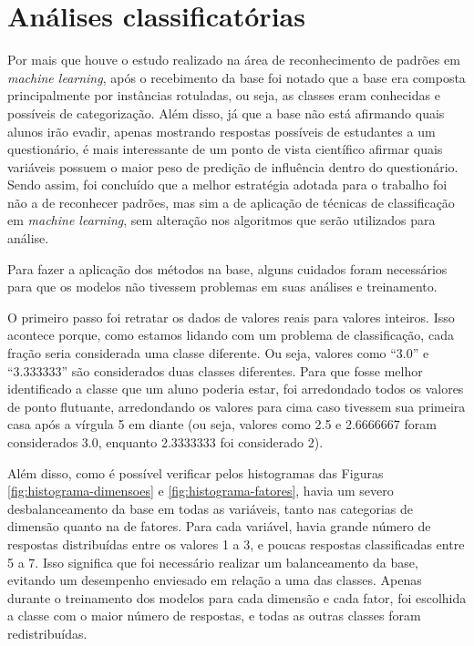 \chapter{Análises classificatórias}

Por mais que houve o estudo realizado na área de reconhecimento de padrões em \textit{machine learning}, após o recebimento da base foi notado que a base era composta principalmente por instâncias rotuladas, ou seja, as classes eram conhecidas e possíveis de categorização. Além disso, já que a base não está afirmando quais alunos irão evadir, apenas mostrando respostas possíveis de estudantes a um questionário, é mais interessante de um ponto de vista científico afirmar quais variáveis possuem o maior peso de predição de influência dentro do questionário. Sendo assim, foi concluído que a melhor estratégia adotada para o trabalho foi não a de reconhecer padrões, mas sim a de aplicação de técnicas de classificação em \textit{machine learning}, sem alteração nos algoritmos que serão utilizados para análise.

Para fazer a aplicação dos métodos na base, alguns cuidados foram necessários para que os modelos não tivessem problemas em suas análises e treinamento.

O primeiro passo foi retratar os dados de valores reais para valores inteiros. Isso acontece porque, como estamos lidando com um problema de classificação, cada fração seria considerada uma classe diferente. Ou seja, valores como ``3.0'' e ``3.333333'' são considerados duas classes diferentes. Para que fosse melhor identificado a classe que um aluno poderia estar, foi arredondado todos os valores de ponto flutuante, arredondando os valores para cima caso tivessem sua primeira casa após a vírgula 5 em diante (ou seja, valores como 2.5 e 2.6666667 foram considerados 3.0, enquanto 2.3333333 foi considerado 2).

Além disso, como é possível verificar pelos histogramas das Figuras \ref{fig:histograma-dimensoes} e \ref{fig:histograma-fatores}, havia um severo desbalanceamento da base em todas as variáveis, tanto nas categorias de dimensão quanto na de fatores. Para cada variável, havia grande número de respostas distribuídas entre os valores 1 a 3, e poucas respostas classificadas entre 5 a 7. Isso significa que foi necessário realizar um balanceamento da base, evitando um desempenho enviesado em relação a uma das classes. Apenas durante o treinamento dos modelos para cada dimensão e cada fator, foi escolhida a classe com o maior número de respostas, e todas as outras classes foram redistribuídas.

